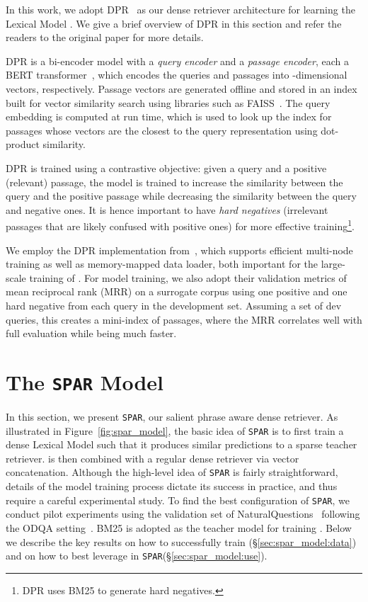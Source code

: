 \documentclass[11pt]{article}
\newcommand{\spar}{\texttt{SPAR}\xspace}
\newcommand{\lexmodel}{Lexical Model}
\newcommand{\lexmodelsymbol}{\xspace}
\newcommand{\secref}[1]{\S\ref{#1}}
\begin{document}
In this work, we adopt DPR~\cite{karpukhin-etal-2020-dense} as our dense retriever architecture for learning the \lexmodel{} \lexmodelsymbol{}.
We give a brief overview of DPR in this section and refer the readers to the original paper for more details.

DPR is a bi-encoder model with a \emph{query encoder} and a \emph{passage encoder}, each a BERT transformer~\cite{devlin-etal-2019-bert}, which encodes the queries and passages into -dimensional vectors, respectively.
Passage vectors are generated offline and stored in an index built for vector similarity search using libraries such as FAISS~\cite{faiss}.
The query embedding is computed at run time, which is used to look up the index for  passages whose vectors are the closest to the query representation using dot-product similarity.

DPR is trained using a contrastive objective: given a query and a positive (relevant) passage, the model is trained to increase the similarity between the query and the positive passage while decreasing the similarity between the query and negative ones.
It is hence important to have \emph{hard negatives} (irrelevant passages that are likely confused with positive ones) for more effective training\footnote{DPR uses BM25 to generate hard negatives.}.

We employ the DPR implementation from~\citet{dpr-scale}, which supports efficient multi-node training as well as memory-mapped data loader, both important for the large-scale training of \lexmodelsymbol{}.
For model training, we also adopt their validation metrics of mean reciprocal rank (MRR) on a surrogate corpus using one positive and one hard negative from each query in the development set.
Assuming a set of  dev queries, this creates a mini-index of  passages, where the MRR correlates well with full evaluation while being much faster. 
\section{The \spar{} Model}\label{sec:spar_model}

In this section, we present \spar{}, our salient phrase aware dense retriever.
As illustrated in Figure~\ref{fig:spar_model}, the basic idea of \spar is to first train a dense \lexmodel{} \lexmodelsymbol such that it produces similar predictions to a sparse teacher retriever.
\lexmodelsymbol{} is then combined with a regular dense retriever via vector concatenation.
Although the high-level idea of \spar{} is fairly straightforward, details of the model training process dictate its success in practice, and thus require a careful experimental study. 
To find the best configuration of \spar{}, we conduct pilot experiments using the validation set of NaturalQuestions~\citep[NQ,][]{kwiatkowski-etal-2019-natural} following the ODQA setting~\cite{lee-etal-2019-latent}.
BM25 is adopted as the teacher model for training \lexmodelsymbol{}.
Below we describe the key results on how to successfully train \lexmodelsymbol{} (\secref{sec:spar_model:data}) and on how to best leverage \lexmodelsymbol{} in \spar (\secref{sec:spar_model:use}).
\end{document}

